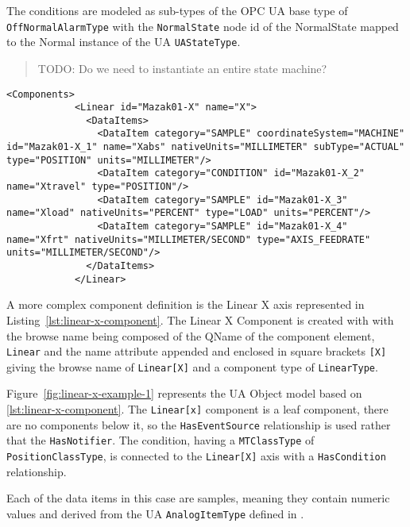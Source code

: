 The conditions are modeled as sub-types of the OPC UA base type of \texttt{OffNormalAlarmType} with the \texttt{NormalState} node id of the NormalState mapped to the Normal instance of the UA \texttt{UAStateType}.

\begin{quote}
    \color{red}
    TODO: Do we need to instantiate an entire state machine?
\end{quote}

\begin{lstlisting}[firstnumber=last,%
    caption={Linear X Component},label={lst:linear-x-component}]
          <Components>
            <Linear id="Mazak01-X" name="X">
              <DataItems>
                <DataItem category="SAMPLE" coordinateSystem="MACHINE" id="Mazak01-X_1" name="Xabs" nativeUnits="MILLIMETER" subType="ACTUAL" type="POSITION" units="MILLIMETER"/>
                <DataItem category="CONDITION" id="Mazak01-X_2" name="Xtravel" type="POSITION"/>
                <DataItem category="SAMPLE" id="Mazak01-X_3" name="Xload" nativeUnits="PERCENT" type="LOAD" units="PERCENT"/>
                <DataItem category="SAMPLE" id="Mazak01-X_4" name="Xfrt" nativeUnits="MILLIMETER/SECOND" type="AXIS_FEEDRATE" units="MILLIMETER/SECOND"/>
              </DataItems>
            </Linear>
\end{lstlisting}

A more complex component definition is the Linear X axis represented in Listing~\ref{lst:linear-x-component}. The Linear X Component is created with with the browse name being composed of the QName of the component element, \texttt{Linear} and the name attribute appended and enclosed in square brackets \texttt{[X]} giving the browse name of \texttt{Linear[X]} and a component type of \texttt{LinearType}.



Figure~\ref{fig:linear-x-example-1} represents the UA Object model based on \ref{lst:linear-x-component}. The \texttt{Linear[x]} component is a leaf component, there are no components below it, so the \texttt{HasEventSource} relationship is used rather that the \texttt{HasNotifier}. The condition, having a \texttt{MTClassType} of \texttt{PositionClassType}, is connected to the \texttt{Linear[X]} axis with a \texttt{HasCondition} relationship.

Each of the data items in this case are samples, meaning they contain numeric values and derived from the UA \texttt{AnalogItemType} defined in \cite{UAPart8}.

